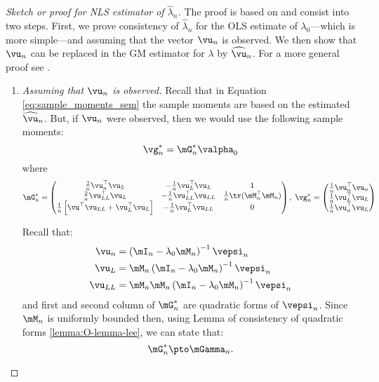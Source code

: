 \begin{proof}[Sketch or proof for NLS estimator of $\widehat{\lambda}_n$]
The proof is based on \cite{kelejian2017spatial} and consist into two steps. First, we prove consistency of $\widehat{\lambda}_n$ for the OLS estimate of $\lambda_0$---which is more simple---and assuming that the vector $\vu_n$ is observed. We then show that $\vu_n$ can be replaced in the GM estimator for $\lambda$ by $\widehat{\vu}_n$. For a more general proof see \citet{kelejian1998generalized, kelejian1999generalized}.
\begin{enumerate}
  \item \emph{Assuming that $\vu_n$ is observed.} Recall that in Equation \eqref{eq:sample_moments_sem} the sample moments are based on the estimated $\widehat{\vu}_n$. But, if $\vu_n$ were observed, then we would use the following sample moments:
\begin{equation*}
  \vg_n^* = \mG_n^*\valpha_0
\end{equation*}
%
where 
\begin{equation*}
  \mG_n^* = \begin{pmatrix}
   \frac{2}{n}\vu^\top_n\vu_L & -\frac{1}{n}\vu_L^\top\vu_L & 1\\
   \frac{2}{n}\vu^\top_{LL}\vu_L & -\frac{1}{n}\vu_{LL}^\top\vu_{LL} & \frac{1}{n} \tr(\mM^\top_n\mM_n)\\
   \frac{1}{n}\left[\vu^\top\vu_{LL} + \vu_L^\top\vu_L\right] & -\frac{1}{n}\vu_{L}^\top\vu_{LL} & 0
        \end{pmatrix},\; 
  \vg_n^* = \begin{pmatrix}
  \frac{1}{n}\vu^\top_n\vu_n \\
  \frac{1}{n}\vu^\top_L\vu_L \\
  \frac{1}{n}\vu^\top_n\vu_L
        \end{pmatrix}
\end{equation*}

Recall that:
\begin{equation*}
  \begin{aligned}
    \vu_n    & = \left(\mI_n - \lambda_0\mM_n\right)^{-1}\vepsi_n \\
    \vu_L    & = \mM_n\left(\mI_n - \lambda_0\mM_n\right)^{-1}\vepsi_n \\
    \vu_{LL} & = \mM_n\mM_n\left(\mI_n - \lambda_0\mM_n\right)^{-1}\vepsi_n
  \end{aligned}
\end{equation*}
%
and first and second column of $\mG^*_n$ are quadratic forms of $\vepsi_n$. Since $\mM_n$ is uniformly bounded then, using Lemma of consistency of quadratic forms \ref{lemma:O-lemma-lee}, we can state that:
\begin{equation*}
\mG^*_n\pto \mGamma_n.
\end{equation*}


\end{enumerate}
\end{proof}

